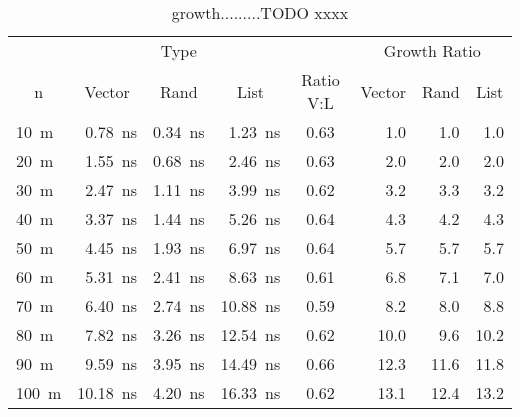 \documentclass[a4paper, 11pt]{article}
\begin{document}
    \begin{table}[h]
        \centering
        \small
\begin{tabular}{lrrrcrrr}
    \toprule
            & \multicolumn{3}{c}{Type} && \multicolumn{3}{c}{Growth Ratio}\\
\cmidrule(lr){2-4}
\cmidrule(lr){6-8}
\multicolumn{1}{c}{n}& \multicolumn{1}{c}{Vector} & \multicolumn{1}{c}{Rand} & \multicolumn{1}{c}{List} & \multicolumn{1}{c}{Ratio V:L} & \multicolumn{1}{c}{Vector} & \multicolumn{1}{c}{Rand} & \multicolumn{1}{c}{List}\\
\cmidrule(lr){1-1}
\cmidrule(lr){2-4}
\cmidrule(lr){5-5}
\cmidrule(lr){6-8}

\SI{10 }{m} & \SI{0.78 }{\nano\second} & \SI{0.34}{\nano\second} & \SI{1.23 }{\nano\second} & \num{0.63} & \num{1.0}  & \num{1.0} & \num{1.0}  \\
\SI{20 }{m} & \SI{1.55 }{\nano\second} & \SI{0.68}{\nano\second} & \SI{2.46 }{\nano\second} & \num{0.63} & \num{2.0}  & \num{2.0} & \num{2.0}  \\
\SI{30 }{m} & \SI{2.47 }{\nano\second} & \SI{1.11}{\nano\second} & \SI{3.99 }{\nano\second} & \num{0.62} & \num{3.2}  & \num{3.3} & \num{3.2}  \\
\SI{40 }{m} & \SI{3.37 }{\nano\second} & \SI{1.44}{\nano\second} & \SI{5.26 }{\nano\second} & \num{0.64} & \num{4.3}  & \num{4.2} & \num{4.3}  \\
\SI{50 }{m} & \SI{4.45 }{\nano\second} & \SI{1.93}{\nano\second} & \SI{6.97 }{\nano\second} & \num{0.64} & \num{5.7}  & \num{5.7} & \num{5.7}  \\
\SI{60 }{m} & \SI{5.31 }{\nano\second} & \SI{2.41}{\nano\second} & \SI{8.63 }{\nano\second} & \num{0.61} & \num{6.8}  & \num{7.1} & \num{7.0}  \\
\SI{70 }{m} & \SI{6.40 }{\nano\second} & \SI{2.74}{\nano\second} & \SI{10.88}{\nano\second} & \num{0.59} & \num{8.2}  & \num{8.0} & \num{8.8}  \\
\SI{80 }{m} & \SI{7.82 }{\nano\second} & \SI{3.26}{\nano\second} & \SI{12.54}{\nano\second} & \num{0.62} & \num{10.0} & \num{9.6} & \num{10.2} \\
\SI{90 }{m} & \SI{9.59 }{\nano\second} & \SI{3.95}{\nano\second} & \SI{14.49}{\nano\second} & \num{0.66} & \num{12.3} & \num{11.6}& \num{11.8} \\
\SI{100}{m} & \SI{10.18}{\nano\second} & \SI{4.20}{\nano\second} & \SI{16.33}{\nano\second} & \num{0.62} & \num{13.1} & \num{12.4}& \num{13.2} \\
\bottomrule
\end{tabular}
    \caption{growth.........TODO xxxx} %
    \label{tab:growth}
    \end{table}
\end{document}
